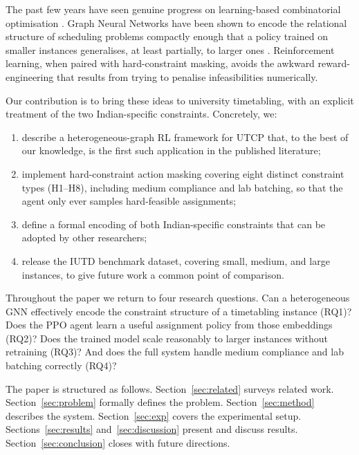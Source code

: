 \documentclass[conference]{IEEEtran}
\begin{document}
The past few years have seen genuine progress on learning-based combinatorial optimisation \cite{bengio2021}. Graph Neural Networks have been shown to encode the relational structure of scheduling problems compactly enough that a policy trained on smaller instances generalises, at least partially, to larger ones \cite{zhang2020l2d}. Reinforcement learning, when paired with hard-constraint masking, avoids the awkward reward-engineering that results from trying to penalise infeasibilities numerically.

Our contribution is to bring these ideas to university timetabling, with an explicit treatment of the two Indian-specific constraints. Concretely, we:

\begin{enumerate}
  \item describe a heterogeneous-graph RL framework for UTCP that, to the best of our knowledge, is the first such application in the published literature;
  \item implement hard-constraint action masking covering eight distinct constraint types (H1--H8), including medium compliance and lab batching, so that the agent only ever samples hard-feasible assignments;
  \item define a formal encoding of both Indian-specific constraints that can be adopted by other researchers;
  \item release the IUTD benchmark dataset, covering small, medium, and large instances, to give future work a common point of comparison.
\end{enumerate}

Throughout the paper we return to four research questions. Can a heterogeneous GNN effectively encode the constraint structure of a timetabling instance (RQ1)? Does the PPO agent learn a useful assignment policy from those embeddings (RQ2)? Does the trained model scale reasonably to larger instances without retraining (RQ3)? And does the full system handle medium compliance and lab batching correctly (RQ4)?

The paper is structured as follows. Section~\ref{sec:related} surveys related work. Section~\ref{sec:problem} formally defines the problem. Section~\ref{sec:method} describes the system. Section~\ref{sec:exp} covers the experimental setup. Sections~\ref{sec:results} and~\ref{sec:discussion} present and discuss results. Section~\ref{sec:conclusion} closes with future directions.


\end{document}
